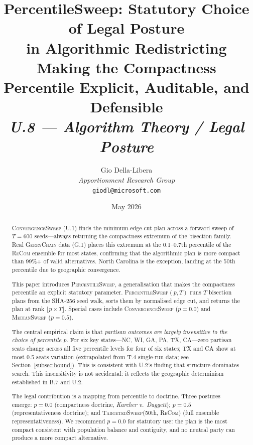 \documentclass[12pt]{article}
\title{%
  \textbf{PercentileSweep: Statutory Choice of Legal Posture}\\
  \textbf{in Algorithmic Redistricting}\\[0.4em]
  \large Making the Compactness Percentile Explicit, Auditable, and Defensible\\[0.8em]
  \normalsize\textit{U.8 --- Algorithm Theory / Legal Posture}%
}
\author{%
  Gio Della-Libera\\
  \textit{Apportionment Research Group}\\
  \small\texttt{giodl@microsoft.com}
}
\date{May 2026}
\newcommand{\ps}{\textsc{PercentileSweep}}
\newcommand{\cs}{\textsc{ConvergenceSweep}}
\newcommand{\ms}{\textsc{MedianSweep}}
\newcommand{\ts}{\textsc{TargetedSweep}}
\newcommand{\recom}{\textsc{ReCom}}
\newcommand{\gc}{\textsc{GerryChain}}
\newcommand{\case}[1]{\textit{#1}}
\newcommand{\karcher}{\case{Karcher v.\ Daggett}}
\newcommand{\floor}[1]{\lfloor #1 \rfloor}
\begin{document}
\maketitle

\begin{abstract}
\noindent
\cs{} (U.1) finds the minimum-edge-cut plan across a forward sweep of
$T = 600$ seeds---always returning the compactness extremum of the bisection
family.
Real \gc{} data (G.1) places this extremum at the 0.1--0.7th percentile of
the \recom{} ensemble for most states, confirming that the algorithmic plan
is more compact than 99\%+ of valid alternatives.
North Carolina is the exception, landing at the 50th percentile due to
geographic convergence.

This paper introduces \ps{}, a generalisation that makes the compactness
percentile an explicit statutory parameter.
\ps{}$(p, T)$ runs $T$ bisection plans from the SHA-256 seed walk, sorts them
by normalised edge cut, and returns the plan at rank $\floor{p \times T}$.
Special cases include \cs{} ($p = 0.0$) and \ms{} ($p = 0.5$).

The central empirical claim is that \emph{partisan outcomes are largely
insensitive to the choice of percentile $p$}.
For six key states---NC, WI, GA, PA, TX, CA---zero partisan seats change
across all five percentile levels for four of six states; TX and CA show
at most 0.5 seats variation (extrapolated from T.4 single-run data;
see Section~\ref{subsec:bound}).
This is consistent with U.2's finding that structure dominates search.
This insensitivity is not accidental: it reflects the geographic determinism
established in B.7 and U.2.

The legal contribution is a mapping from percentile to doctrine.
Three postures emerge: $p = 0.0$ (compactness doctrine, \karcher{});
$p = 0.5$ (representativeness doctrine); and \ts{}(50th, \recom{}) (full
ensemble representativeness).
We recommend $p = 0.0$ for statutory use: the plan is the most compact
consistent with population balance and contiguity, and no neutral party
can produce a more compact alternative.
\end{abstract}

\tableofcontents
\newpage










\end{document}
